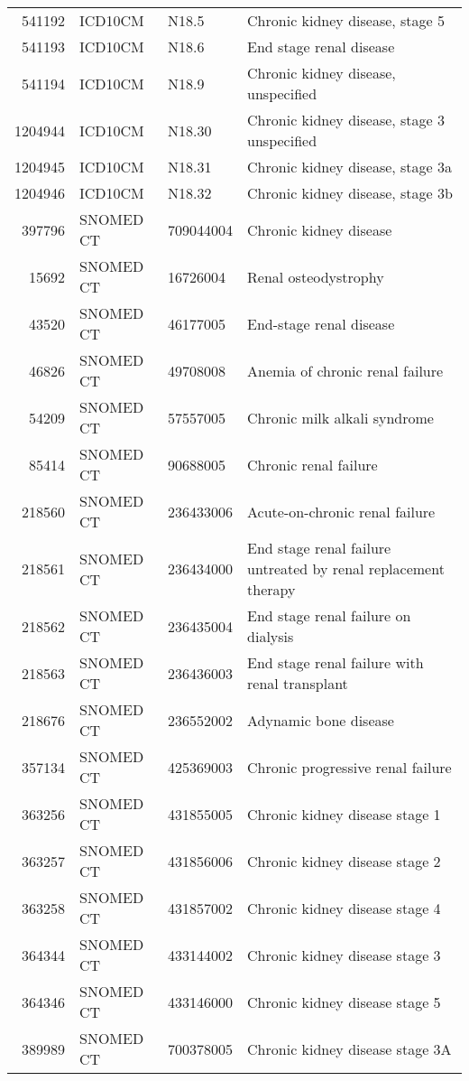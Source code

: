 \begin{table}[ht]
\begin{tabular}{rlll}
  541192 & ICD10CM & N18.5 & Chronic kidney disease, stage 5 \\ 
  541193 & ICD10CM & N18.6 & End stage renal disease \\ 
  541194 & ICD10CM & N18.9 & Chronic kidney disease, unspecified \\ 
  1204944 & ICD10CM & N18.30 & Chronic kidney disease, stage 3 unspecified \\ 
  1204945 & ICD10CM & N18.31 & Chronic kidney disease, stage 3a \\ 
  1204946 & ICD10CM & N18.32 & Chronic kidney disease, stage 3b \\ 
  397796 & SNOMED CT & 709044004 & Chronic kidney disease \\ 
  15692 & SNOMED CT & 16726004 & Renal osteodystrophy \\ 
  43520 & SNOMED CT & 46177005 & End-stage renal disease \\ 
  46826 & SNOMED CT & 49708008 & Anemia of chronic renal failure \\ 
  54209 & SNOMED CT & 57557005 & Chronic milk alkali syndrome \\ 
  85414 & SNOMED CT & 90688005 & Chronic renal failure \\ 
  218560 & SNOMED CT & 236433006 & Acute-on-chronic renal failure \\ 
  218561 & SNOMED CT & 236434000 & End stage renal failure untreated by renal replacement therapy \\ 
  218562 & SNOMED CT & 236435004 & End stage renal failure on dialysis \\ 
  218563 & SNOMED CT & 236436003 & End stage renal failure with renal transplant \\ 
  218676 & SNOMED CT & 236552002 & Adynamic bone disease \\ 
  357134 & SNOMED CT & 425369003 & Chronic progressive renal failure \\ 
  363256 & SNOMED CT & 431855005 & Chronic kidney disease stage 1 \\ 
  363257 & SNOMED CT & 431856006 & Chronic kidney disease stage 2 \\ 
  363258 & SNOMED CT & 431857002 & Chronic kidney disease stage 4 \\ 
  364344 & SNOMED CT & 433144002 & Chronic kidney disease stage 3 \\ 
  364346 & SNOMED CT & 433146000 & Chronic kidney disease stage 5 \\ 
  389989 & SNOMED CT & 700378005 & Chronic kidney disease stage 3A \\ 

\end{tabular}
\end{table}
